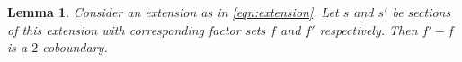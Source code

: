 \documentclass{dcthesis}
\newcommand{\mm}[1]{{\color{blue} \sf MM: [#1]}}
\newcommand{\wt}[1]{\widetilde{#1}}
\numberwithin{equation}{section}
\newtheorem{lemma}[equation]{Lemma}
\theoremstyle{definition}
\theoremstyle{remark}
\begin{document}
{{{      %
    \begin{lemma}
      \label{lem:choiceofsectioncoboundary}
      Consider an extension as in
      \eqref{eqn:extension}.
      Let $s$ and $s'$ be sections of this extension
      with corresponding factor sets $f$ and $f'$
      respectively.
      Then $f'-f$ is a $2$-coboundary.
    \end{lemma}
}}}
\end{document}
